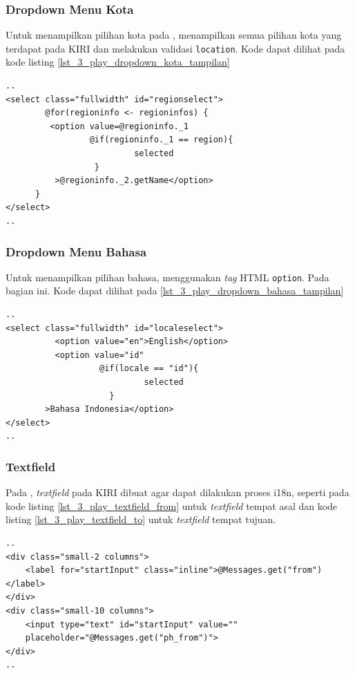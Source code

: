 \subsubsection{Dropdown Menu Kota}
Untuk menampilkan pilihan kota pada \play, menampilkan semua pilihan kota yang terdapat pada KIRI dan melakukan validasi \verb!location!. Kode dapat dilihat pada kode listing \ref{lst_3_play_dropdown_kota_tampilan}

\begin{lstlisting}[caption=Menampilkan pilihan kota kepada pengguna ,label = {lst_3_play_dropdown_kota_tampilan}]
..
<select class="fullwidth" id="regionselect">
    	@for(regioninfo <- regioninfos) {
         <option value=@regioninfo._1
                 @if(regioninfo._1 == region){
                          selected
                  }
          >@regioninfo._2.getName</option>
      }
</select>
..
\end{lstlisting}

\subsubsection{Dropdown Menu Bahasa}
Untuk menampilkan pilihan bahasa, menggunakan \textit{tag} HTML \verb!option!. Pada bagian ini. Kode dapat dilihat pada \ref{lst_3_play_dropdown_bahasa_tampilan}

\begin{lstlisting}[caption=Menampilkan pilihan bahasa kepada pengguna ,label = {lst_3_play_dropdown_bahasa_tampilan}]
..
<select class="fullwidth" id="localeselect">
          <option value="en">English</option>
          <option value="id"
                   @if(locale == "id"){
                            selected
                     }
        >Bahasa Indonesia</option>
</select>
..
\end{lstlisting}

\subsubsection{Textfield}
Pada \play, \textit{textfield} pada KIRI dibuat  agar dapat dilakukan proses i18n, seperti pada kode listing \ref{lst_3_play_textfield_from} untuk \textit{textfield} tempat asal dan kode listing \ref{lst_3_play_textfield_to} untuk \textit{textfield} tempat tujuan.

\begin{lstlisting}[caption=Menampilkan \textit{textfield} tempat awal kepada pengguna ,label = {lst_3_play_textfield_from}]
..
<div class="small-2 columns">
    <label for="startInput" class="inline">@Messages.get("from")</label>
</div>
<div class="small-10 columns">
    <input type="text" id="startInput" value=""
    placeholder="@Messages.get("ph_from")">
</div>
..
\end{lstlisting}

